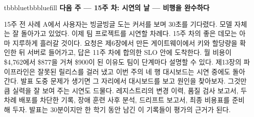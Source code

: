 \vspace{5.0pt}

\begin{calloutbox}{tbbblue}{tbbbluefill}
{\normalsize\bfseries\color{tbbblue}다음 주 — 15주 차: 시연의 날 — 비행을 완수하다}\par\vspace{3pt}
15주 전 사례 A에서 사용자는 빙글빙글 도는 커서를 보며 30초를 기다렸다. 모델 자체는 잘 돌아가고 있었다. 이제 팀 프로젝트를 시연할 차례다. 15주 차의 좋은 데모는 아마 지루하게 흘러갈 것이다. 요청은 제6장에서 만든 게이트웨이에서 키와 할당량을 확인한 뒤 서버로 들어가고, 답은 11주 차에 합의한 SLO 안에 도착한다. 월 비용이 \$4,762에서 \$877을 거쳐 \$900이 된 이유도 팀이 단계마다 설명할 수 있다. 제13장의 파이프라인은 잘못된 릴리스를 걸러 냈고 이번 주의 네 행 대시보드는 시연 중에도 돌아간다. 발표 도중 문제가 생기면 그 자리에서 대시보드를 보고 원인을 찾아보자. 그것만큼 실력을 잘 보여 주는 시연도 드물다. 레지스트리의 변경 이력, 품질 검사 보고서, 두 차례 배포를 차단한 기록, 장애 훈련 사후 분석, 드리프트 보고서, 최종 비용표를 준비해 두자. 발표는 30분이지만 한 학기 동안 남긴 이 기록들이 평가의 근거가 된다.
\end{calloutbox}
